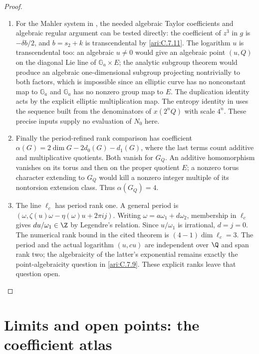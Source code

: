 \begin{proof}
\begin{enumerate}[label=\arabic*.,leftmargin=*]
\item For the Mahler system in
\citep[Theorem1.1 and system(1.2)]{adamczewski2017mahler},
the needed algebraic Taylor coefficients and algebraic regular
argument can be tested directly: the coefficient of $z^3$ in
$g$ is $-\delta b/2$, and $b=s_2+k$ is transcendental by
\ref{ari:C.7.11}. The logarithm $u$ is transcendental too:
an algebraic $u\ne0$ would give an algebraic point $(u,Q)$
on the diagonal Lie line of $\mathbb G_a\times E$; the analytic
subgroup theorem would produce an algebraic one-dimensional
subgroup projecting nontrivially to both factors, which is
impossible since an elliptic curve has no nonconstant map to
$\mathbb G_a$ and $\mathbb G_a$ has no nonzero group map to $E$.
The duplication identity acts by the explicit elliptic
multiplication map. The entropy identity in
\citep[Theorem5.1]{einsiedler2001entropy} uses the sequence
built from the denominators of $x(2^nQ)$ with scale $4^n$.
These precise inputs supply no evaluation of $N_0$ here.

\item Finally the period-refined rank comparison
\citep[Theorem4.1 and Corollary4.3]{waldschmidt1988periodrank}
\citep[main theorem,p.363]{roy1993periodrank}
has coefficient $\alpha(G)=2\dim G-2d_0(G)-d_1(G)$,
where the last terms count additive and multiplicative
quotients. Both vanish for $G_Q$. An additive homomorphism
vanishes on its torus and then on the proper quotient $E$;
a nonzero torus character extending to $G_Q$ would kill a
nonzero integer multiple of its nontorsion extension class.
Thus $\alpha(G_Q)=4$.

\item The line $\ell_c$ has period rank one. A general period is
$(\omega,\zeta(u)\omega-\eta(\omega)u+2\pi i j)$.
Writing $\omega=a\omega_1+d\omega_2$, membership in
$\ell_c$ gives $du/\omega_1\in\Z$ by Legendre's relation.
Since $u/\omega_1$ is irrational, $d=j=0$. The numerical
rank bound in the cited theorem is
$(4-1)\dim\ell_c=3$. The period and the actual logarithm
$(u,cu)$ are independent over $\Q$ and span rank two;
the algebraicity of the latter's exponential remains exactly
the point-algebraicity question in \ref{ari:C.7.9}. These
explicit ranks leave that question open.
\end{enumerate}
\end{proof}


\section{Limits and open points: the coefficient atlas}

